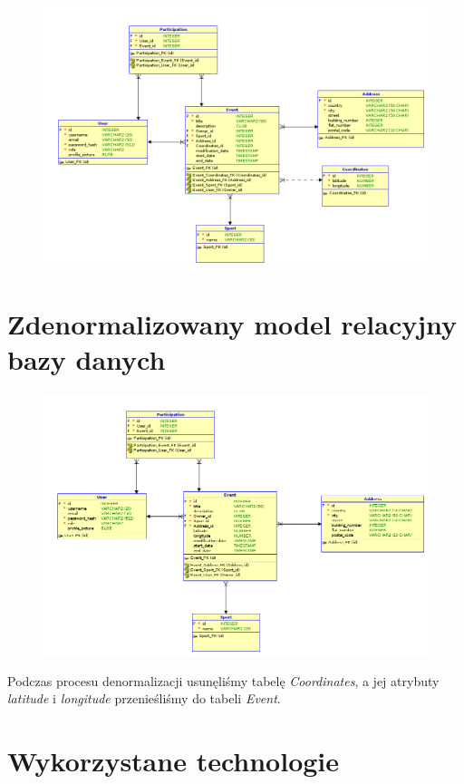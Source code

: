 \documentclass[11pt,a4paper]{article}
\begin{document}
\begin{figure} [H]
    \centering
    \includegraphics[width=0.95\linewidth]{model/model_rel.png}
\end{figure}

\section{Zdenormalizowany model relacyjny bazy danych}

\begin{figure} [H]
    \centering
    \includegraphics[width=0.95\linewidth]{model/model_denorm.png}
\end{figure}

Podczas procesu denormalizacji usunęliśmy tabelę \textit{Coordinates}, a jej atrybuty \textit{latitude} i \textit{longitude} przenieśliśmy do tabeli \textit{Event}.

\section{Wykorzystane technologie}
\end{document}
